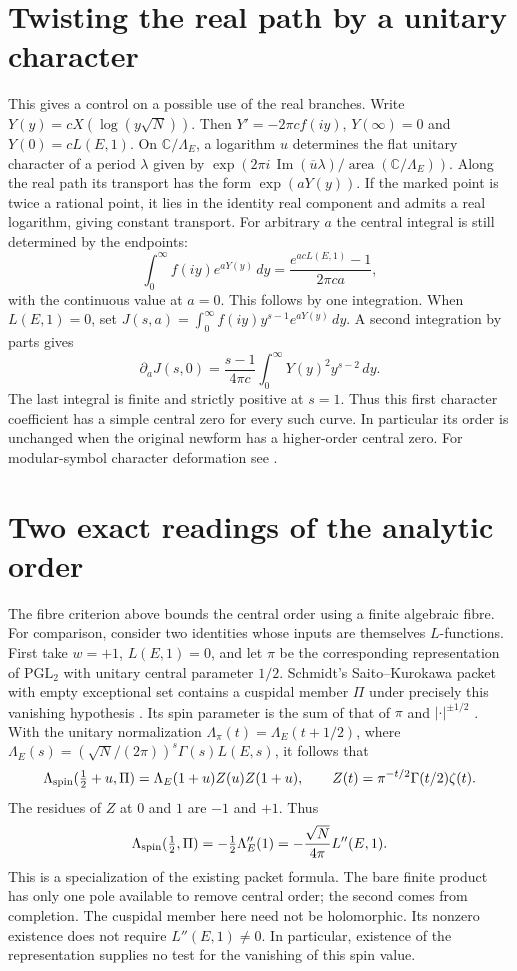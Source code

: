 \documentclass[11pt]{article}
\begin{document}
\section*{Twisting the real path by a unitary character}
This gives a control on a possible use of the real branches.
Write $Y(y)=cX(\log(y\sqrt N))$. Then $Y'=-2\pi c f(iy)$,
$Y(\infty)=0$ and $Y(0)=cL(E,1)$. On $\mathbb C/\Lambda_E$, a
logarithm $u$ determines the flat unitary character of a period
$\lambda$ given by $\exp(2\pi i\,\operatorname{Im}(\overline u\lambda)/
\operatorname{area}(\mathbb C/\Lambda_E))$. Along the real path its
transport has the form $\exp(aY(y))$. If the marked point is twice
a rational point, it lies in the identity real component and admits
a real logarithm, giving constant transport. For arbitrary $a$ the
central integral is still determined by the endpoints:
\[
 \int_0^\infty f(iy)e^{aY(y)}\,dy
   =\frac{e^{a cL(E,1)}-1}{2\pi c a},
\]
with the continuous value at $a=0$. This follows by one integration.
When $L(E,1)=0$, set
$J(s,a)=\int_0^\infty f(iy)y^{s-1}e^{aY(y)}\,dy$.
A second integration by parts gives
\[
 \partial_a J(s,0)=
 \frac{s-1}{4\pi c}\int_0^\infty Y(y)^2 y^{s-2}\,dy .
\]
The last integral is finite and strictly positive at $s=1$. Thus this
first character coefficient has a simple central zero for every such
curve. In particular its order is unchanged when the original newform
has a higher-order central zero. For modular-symbol character
deformation see \cite{PR}.

\section*{Two exact readings of the analytic order}
The fibre criterion above bounds the central order using a finite
algebraic fibre. For comparison, consider two identities whose inputs
are themselves $L$-functions. First take $w=+1$, $L(E,1)=0$, and let
$\pi$ be the corresponding representation of $\mathrm{PGL}_2$ with
unitary central parameter $1/2$. Schmidt's Saito--Kurokawa packet
with empty exceptional set contains a cuspidal member $\Pi$ under
precisely this vanishing hypothesis \cite[Thm.~3.1]{SK}. Its spin
parameter is the sum of that of $\pi$ and $|\cdot|^{\pm1/2}$
\cite[Prop.~5.5]{Gan}. With the unitary normalization
$\Lambda_\pi(t)=\Lambda_E(t+1/2)$, where
$\Lambda_E(s)=(\sqrt N/(2\pi))^s\Gamma(s)L(E,s)$, it follows that
\[
 \Lambda_{\rm spin}(\tfrac12+u,\Pi)
 =\Lambda_E(1+u)Z(u)Z(1+u),\qquad
 Z(t)=\pi^{-t/2}\Gamma(t/2)\zeta(t).
\]
The residues of $Z$ at $0$ and $1$ are $-1$ and $+1$. Thus
\[
 \Lambda_{\rm spin}(\tfrac12,\Pi)=-\tfrac12\Lambda_E''(1)
   =-\frac{\sqrt N}{4\pi}L''(E,1).
\]
This is a specialization of the existing packet formula. The bare
finite product has only one pole available to remove central order;
the second comes from completion. The cuspidal member here need not be
holomorphic. Its nonzero existence does not require $L''(E,1)\ne0$.
In particular, existence of the representation supplies no test for
the vanishing of this spin value.
\end{document}
